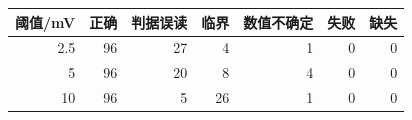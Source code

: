 \begin{tabular}{rrrrrrr}
\toprule
阈值/mV & 正确 & 判据误读 & 临界 & 数值不确定 & 失败 & 缺失\\
\midrule
2.5 & 96 & 27 & 4 & 1 & 0 & 0\\
5 & 96 & 20 & 8 & 4 & 0 & 0\\
10 & 96 & 5 & 26 & 1 & 0 & 0\\
\bottomrule
\end{tabular}
